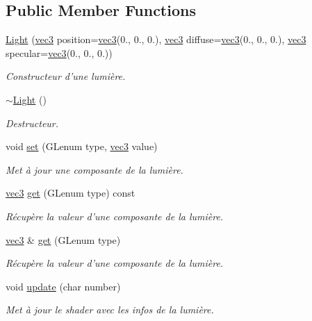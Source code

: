 \subsection*{Public Member Functions}
\begin{DoxyCompactItemize}
\item 
\hyperlink{class_light_aa7bcc37dee068f7266f86e07a3dfe4f0}{Light} (\hyperlink{structvec3}{vec3} position=\hyperlink{structvec3}{vec3}(0., 0., 0.), \hyperlink{structvec3}{vec3} diffuse=\hyperlink{structvec3}{vec3}(0., 0., 0.), \hyperlink{structvec3}{vec3} specular=\hyperlink{structvec3}{vec3}(0., 0., 0.))
\begin{DoxyCompactList}\small\item\em Constructeur d'une lumière. \end{DoxyCompactList}\item 
\hyperlink{class_light_ad0e59fad13bb6cfadc25b2c477e9ddc7}{$\sim$\+Light} ()
\begin{DoxyCompactList}\small\item\em Destructeur. \end{DoxyCompactList}\item 
void \hyperlink{class_light_a9fcc4b3ffdeedbe214ee8384c7d311b9}{set} (G\+Lenum type, \hyperlink{structvec3}{vec3} value)
\begin{DoxyCompactList}\small\item\em Met à jour une composante de la lumière. \end{DoxyCompactList}\item 
\hyperlink{structvec3}{vec3} \hyperlink{class_light_ad0f5f939bc047e39c6deb2e264a5a2c1}{get} (G\+Lenum type) const 
\begin{DoxyCompactList}\small\item\em Récupère la valeur d'une composante de la lumière. \end{DoxyCompactList}\item 
\hyperlink{structvec3}{vec3} \& \hyperlink{class_light_a74a0381255c1c7e002ac583401a46de0}{get} (G\+Lenum type)
\begin{DoxyCompactList}\small\item\em Récupère la valeur d'une composante de la lumière. \end{DoxyCompactList}\item 
void \hyperlink{class_light_a1db2ef9e527f873112c948acfd276a68}{update} (char number)
\begin{DoxyCompactList}\small\item\em Met à jour le shader avec les infos de la lumière. \end{DoxyCompactList}\end{DoxyCompactItemize}
